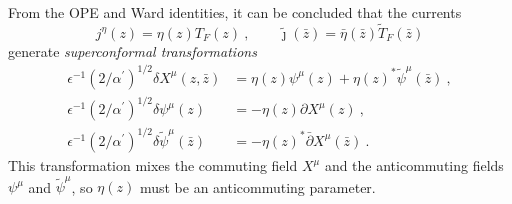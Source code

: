 From the OPE and Ward identities, it can be concluded that the currents
\begin{equation}
	j^{\eta}(z)=\eta(z)T_{F}(z)\:, \qquad
	\tilde{\jmath}(\bar{z})=\bar{\eta}(\bar{z}) \tilde{T}_{F}(\bar{z}) \label{10.1.9}
\end{equation}
generate \emph{superconformal transformations}
\begin{subequations}
	\begin{align}
		\epsilon^{-1}(2/\alpha^{\prime})^{1/2}\delta X^{\mu}(z,\bar{z}) &= \eta(z)\psi^{\mu}(z) + \eta(z)^{\ast} \tilde{\psi}^{\mu}(\bar{z})\:, \label{10.1.10a} \\
		\epsilon^{-1}(2/\alpha^{\prime})^{1/2}\delta \psi^{\mu}(z) &= -\eta(z)\partial X^{\mu}(z) \:, \label{10.1.10b}  \\
		\epsilon^{-1}(2/\alpha^{\prime})^{1/2}\delta\tilde{\psi}^{\mu}(\bar{z}) &=-\eta(z)^{\ast}\bar{\partial} X^{\mu}(\bar{z}) \:. \label{10.1.10c}
	\end{align}
\end{subequations}
This transformation mixes the commuting field $X^{\mu}$ and the anticommuting fields $\psi^{\mu}$ and $\tilde{\psi}^{\mu}$, so $\eta(z)$ must be an anticommuting parameter. 

